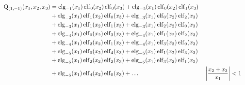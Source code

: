 \begin{equation*} \begin{aligned}
\mathrm{Q}_{(1,-1)}(x_1, x_2, x_3) &=   
  \elg_{-1}(x_1) \elf_0(x_2) \elf_0(x_3)
+ \elg_{-2}(x_1) \elf_0(x_2) \elf_1(x_3) \\ &
+ \elg_{-2}(x_1) \elf_1(x_2) \elf_0(x_3)
+ \elg_{-3}(x_1) \elf_0(x_2) \elf_2(x_3) \\ &
+ \elg_{-3}(x_1) \elf_1(x_2) \elf_1(x_3)
+ \elg_{-3}(x_1) \elf_2(x_2) \elf_0(x_3) \\ &
+ \elg_{-4}(x_1) \elf_0(x_2) \elf_3(x_3)
+ \elg_{-4}(x_1) \elf_1(x_2) \elf_2(x_3) \\ &
+ \elg_{-4}(x_1) \elf_2(x_2) \elf_1(x_3)
+ \elg_{-4}(x_1) \elf_3(x_2) \elf_0(x_3) \\ &
+ \elg_{-5}(x_1) \elf_0(x_2) \elf_4(x_3)
+ \elg_{-5}(x_1) \elf_1(x_2) \elf_3(x_3) \\ &
+ \elg_{-5}(x_1) \elf_2(x_2) \elf_2(x_3)
+ \elg_{-5}(x_1) \elf_3(x_2) \elf_1(x_3) \\ &
+ \elg_{-5}(x_1) \elf_4(x_2) \elf_0(x_3)
+ \ldots & 
&\left| \frac{x_2 + x_3}{x_1} \right| < 1 \\
\end{aligned} \end{equation*}
